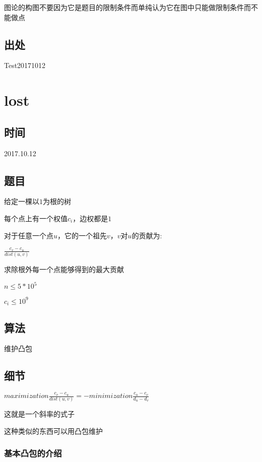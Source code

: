 \documentclass[a4paper]{article}
\begin{document}
		图论的构图不要因为它是题目的限制条件而单纯认为它在图中只能做限制条件而不能做点
		
	\subsection{出处}
		
		Test20171012
	
	\newpage
	
	\section{lost}
		
	\subsection{时间}
		
		2017.10.12
		
	\subsection{题目}
		
		给定一棵以$1$为根的树
		
		每个点上有一个权值$c_i$，边权都是$1$
		
		对于任意一个点$u$，它的一个祖先$v$，$v$对$u$的贡献为:
		
		$\frac{c_v - c_u}{dist(u,v)}$
		
		求除根外每一个点能够得到的最大贡献
		
		$n \leq 5*10^5$
		
		$c_i\leq 10^9$
		
	\subsection{算法}
		
		维护凸包
		
	\subsection{细节}
		
		$maximization{\frac{c_v-c_u}{dist(u,v)}} = -minimization{\frac{c_u-c_v}{d_u-d_v}}$
		
		这就是一个斜率的式子
		
		这种类似的东西可以用凸包维护
		
		\subsubsection{基本凸包的介绍}
		
\end{document}
